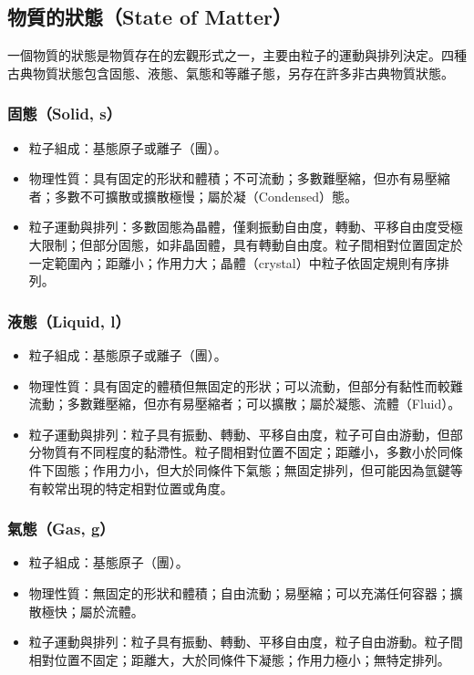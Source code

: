 \documentclass[a4paper,12pt]{report}
\begin{document}
\subsection{物質的狀態（State of Matter）}
一個物質的狀態是物質存在的宏觀形式之一，主要由粒子的運動與排列決定。四種古典物質狀態包含固態、液態、氣態和等離子態，另存在許多非古典物質狀態。
\subsubsection{固態（Solid, s）}
\begin{itemize}
\item 粒子組成：基態原子或離子（團）。
\item 物理性質：具有固定的形狀和體積；不可流動；多數難壓縮，但亦有易壓縮者；多數不可擴散或擴散極慢；屬於凝（Condensed）態。
\item 粒子運動與排列：多數固態為晶體，僅剩振動自由度，轉動、平移自由度受極大限制；但部分固態，如非晶固體，具有轉動自由度。粒子間相對位置固定於一定範圍內；距離小；作用力大；晶體（crystal）中粒子依固定規則有序排列。
\end{itemize}
\subsubsection{液態（Liquid, l）}
\begin{itemize}
\item 粒子組成：基態原子或離子（團）。
\item 物理性質：具有固定的體積但無固定的形狀；可以流動，但部分有黏性而較難流動；多數難壓縮，但亦有易壓縮者；可以擴散；屬於凝態、流體（Fluid）。
\item 粒子運動與排列：粒子具有振動、轉動、平移自由度，粒子可自由游動，但部分物質有不同程度的黏滯性。粒子間相對位置不固定；距離小，多數小於同條件下固態；作用力小，但大於同條件下氣態；無固定排列，但可能因為氫鍵等有較常出現的特定相對位置或角度。
\end{itemize}
\subsubsection{氣態（Gas, g）}
\begin{itemize}
\item 粒子組成：基態原子（團）。
\item 物理性質：無固定的形狀和體積；自由流動；易壓縮；可以充滿任何容器；擴散極快；屬於流體。
\item 粒子運動與排列：粒子具有振動、轉動、平移自由度，粒子自由游動。粒子間相對位置不固定；距離大，大於同條件下凝態；作用力極小；無特定排列。
\end{itemize}
\end{document}

